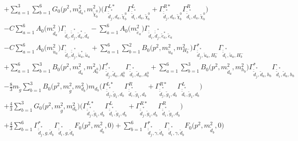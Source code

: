 \begin{itemize}
\begin{align}
 &+\sum_{a=1}^{3}\sum_{b=1}^{6}{G_0\Big(p^{2},m^2_{d_{{a}}},m^2_{\tilde{\chi}^0_{{b}}}\Big)} \Big({\Gamma^{L*}_{\check{\tilde{d}}^*_{{j}},d_{{a}},\tilde{\chi}^0_{{b}}}} {\Gamma^L_{\check{\tilde{d}}^*_{{i}},d_{{a}},\tilde{\chi}^0_{{b}}}}  + {\Gamma^{R*}_{\check{\tilde{d}}^*_{{j}},d_{{a}},\tilde{\chi}^0_{{b}}}} {\Gamma^R_{\check{\tilde{d}}^*_{{i}},d_{{a}},\tilde{\chi}^0_{{b}}}} \Big)\nonumber \\ 
 &- C \sum_{a=1}^{6}{A_0\Big(m^2_{\tilde{d}_{{a}}}\Big)} {\Gamma_{\check{\tilde{d}}_{{i}},\check{\tilde{d}}^*_{{j}},\tilde{d}^*_{{a}},\tilde{d}_{{a}}}}  - \sum_{a=1}^{6}{A_0\Big(m^2_{\tilde{e}_{{a}}}\Big)} {\Gamma_{\check{\tilde{d}}_{{i}},\check{\tilde{d}}^*_{{j}},\tilde{e}^*_{{a}},\tilde{e}_{{a}}}}  \nonumber \\ 
 &- C \sum_{a=1}^{6}{A_0\Big(m^2_{\tilde{u}_{{a}}}\Big)} {\Gamma_{\check{\tilde{d}}_{{i}},\check{\tilde{d}}^*_{{j}},\tilde{u}^*_{{a}},\tilde{u}_{{a}}}}  +\sum_{a=1}^{6}\sum_{b=1}^{2}{B_0\Big(p^{2},m^2_{\tilde{u}_{{a}}},m^2_{H^-_{{b}}}\Big)} {\Gamma^*_{\check{\tilde{d}}^*_{{j}},\tilde{u}_{{a}},H^-_{{b}}}} {\Gamma_{\check{\tilde{d}}^*_{{i}},\tilde{u}_{{a}},H^-_{{b}}}} \nonumber \\ 
 &+\sum_{a=1}^{6}\sum_{b=1}^{3}{B_0\Big(p^{2},m^2_{\tilde{d}_{{a}}},m^2_{A^0_{{b}}}\Big)} {\Gamma^*_{\check{\tilde{d}}^*_{{j}},\tilde{d}_{{a}},A^0_{{b}}}} {\Gamma_{\check{\tilde{d}}^*_{{i}},\tilde{d}_{{a}},A^0_{{b}}}} +\sum_{a=1}^{6}\sum_{b=1}^{3}{B_0\Big(p^{2},m^2_{\tilde{d}_{{a}}},m^2_{h_{{b}}}\Big)} {\Gamma^*_{\check{\tilde{d}}^*_{{j}},\tilde{d}_{{a}},h_{{b}}}} {\Gamma_{\check{\tilde{d}}^*_{{i}},\tilde{d}_{{a}},h_{{b}}}} \nonumber \\ 
 &-\frac{8}{3} m_{\tilde{g}} \sum_{b=1}^{3}{B_0\Big(p^{2},m^2_{\tilde{g}},m^2_{d_{{b}}}\Big)} m_{d_{{b}}} \Big({\Gamma^{L*}_{\check{\tilde{d}}^*_{{j}},\tilde{g}_{{1}},d_{{b}}}} {\Gamma^R_{\check{\tilde{d}}^*_{{i}},\tilde{g}_{{1}},d_{{b}}}}  + {\Gamma^{R*}_{\check{\tilde{d}}^*_{{j}},\tilde{g}_{{1}},d_{{b}}}} {\Gamma^L_{\check{\tilde{d}}^*_{{i}},\tilde{g}_{{1}},d_{{b}}}} \Big) \nonumber \\ 
 &+\frac{4}{3} \sum_{b=1}^{3}{G_0\Big(p^{2},m^2_{\tilde{g}},m^2_{d_{{b}}}\Big)} \Big({\Gamma^{L*}_{\check{\tilde{d}}^*_{{j}},\tilde{g}_{{1}},d_{{b}}}} {\Gamma^L_{\check{\tilde{d}}^*_{{i}},\tilde{g}_{{1}},d_{{b}}}}  + {\Gamma^{R*}_{\check{\tilde{d}}^*_{{j}},\tilde{g}_{{1}},d_{{b}}}} {\Gamma^R_{\check{\tilde{d}}^*_{{i}},\tilde{g}_{{1}},d_{{b}}}} \Big) \nonumber \\ 
 &+\frac{4}{3} \sum_{b=1}^{6}{\Gamma^*_{\check{\tilde{d}}^*_{{j}},g,\tilde{d}_{{b}}}} {\Gamma_{\check{\tilde{d}}^*_{{i}},g,\tilde{d}_{{b}}}} {F_0\Big(p^{2},m^2_{\tilde{d}_{{b}}},0\Big)}  +\sum_{b=1}^{6}{\Gamma^*_{\check{\tilde{d}}^*_{{j}},\gamma,\tilde{d}_{{b}}}} {\Gamma_{\check{\tilde{d}}^*_{{i}},\gamma,\tilde{d}_{{b}}}} {F_0\Big(p^{2},m^2_{\tilde{d}_{{b}}},0\Big)} \nonumber \\ 

\end{align}
\end{itemize}
